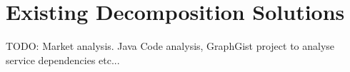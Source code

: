 \section{Existing Decomposition Solutions}

TODO: Market analysis. Java Code analysis, GraphGist project to analyse service dependencies etc...






